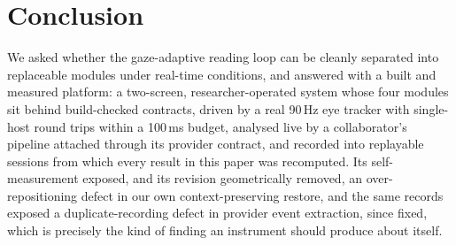 \section{Conclusion}
\label{sec:conclusion}

We asked whether the gaze-adaptive reading loop can be cleanly separated into replaceable modules under real-time conditions, and answered with a built and measured platform: a two-screen, researcher-operated system whose four modules sit behind build-checked contracts, driven by a real 90\,Hz eye tracker with single-host round trips within a 100\,ms budget, analysed live by a collaborator's pipeline attached through its provider contract, and recorded into replayable sessions from which every result in this paper was recomputed.
Its self-measurement exposed, and its revision geometrically removed, an over-repositioning defect in our own context-preserving restore, and the same records exposed a duplicate-recording defect in provider event extraction, since fixed, which is precisely the kind of finding an instrument should produce about itself.
